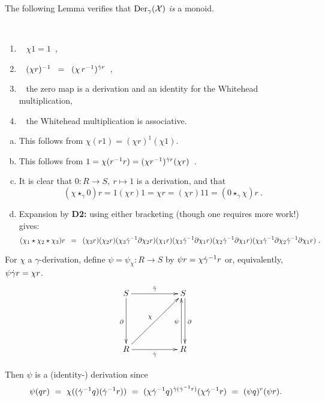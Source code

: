 The following Lemma verifies that $\mathrm{Der}_{\gamma}(\mathcal{X})$ \emph{is} a monoid.
 
\begin{lem} \label{lem:invchir}
\mbox{  }\\
\vspace{-5mm}
\begin{enumerate}[{\rm (a)}]
\item~
$\chi 1 = 1$~,
\item~
$(\chi r)^{-1} \;\;=\;\; (\chi\,r^{-1})^{\dot{\gamma} r}$~,
\item~
the zero map is a derivation and an identity for the Whitehead multiplication,
\item~
the Whitehead multiplication is associative. 
\end{enumerate}
\end{lem}
\begin{pf}
\begin{enumerate}[(a)]
\item
This follows from $\chi(r1) = (\chi r)^1(\chi 1)$.
\item 
This follows from  $1 = \chi(r^{-1}r) = (\chi r^{-1})^{\dot{\gamma} r}(\chi r)$~.
\item
It is clear that $0 : R \to S,~ r \mapsto 1$ is a derivation, and that
$$
(\chi\star_{\gamma}0)r = 1(\chi r)1 = \chi r = (\chi r)11 
= (0\star_{\gamma}\chi)r~.
$$
\item
Expansion by {\bf D2:} using either bracketing 
(though one requires more work!) gives: 
$$
(\chi_1 \star \chi_2 \star \chi_3)r \;\;=\;\;
(\chi_3 r)(\chi_2 r)(\chi_3\dot{\gamma}^{-1}\partial\chi_2 r)
(\chi_1 r)(\chi_3\dot{\gamma}^{-1}\partial\chi_1 r)(\chi_2\dot{\gamma}^{-1}\partial\chi_1 r)
(\chi_3\dot{\gamma}^{-1}\partial\chi_2\dot{\gamma}^{-1}\partial\chi_1 r)~.
$$
\end{enumerate}
\end{pf}

For $\chi$ a $\gamma$-derivation, define 
$\psi=\psi_{\chi} : R \to S$ by $\psi r = \chi \dot{\gamma}^{-1}r$ or, equivalently, 
$\psi\dot{\gamma} r = \chi r$.
\begin{equation} \label{eq:chi-psi}
\vcenter{\xymatrix{
   S \ar[rr]^{\ddg} \ar[dd]_{\partial} 
     && S \ar[dd] <0.5ex>^{\partial} \\
     &&  \\
   R \ar[uurr]^{\chi} \ar[rr]_{\dg} 
     && R \ar[uu] <0.5ex>^{\psi}
}}
\end{equation}

\noindent
Then $\psi$ is a (identity-) derivation since 
$$
\psi(qr)
~=~ \chi((\dot{\gamma}^{-1}q)(\dot{\gamma}^{-1}r)) 
~=~ (\chi\dot{\gamma}^{-1}q)^{\dot{\gamma}(\dot{\gamma}^{-1}r)}(\chi\dot{\gamma}^{-1}r) 
~=~ (\psi q)^r(\psi r).
$$

